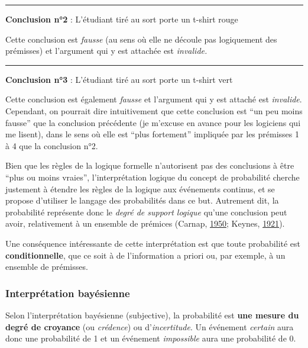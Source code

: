 \documentclass[
  a4paper,11pt,twoside,onecolumn,openright,final,oldfontcommands]{memoir}
\theoremstyle{definition}
\theoremstyle{definition}
\theoremstyle{definition}
\theoremstyle{remark}
\begin{document}
\par

\noindent

\rule{\textwidth}{1pt}

\textbf{Conclusion n°2} : L'étudiant tiré au sort porte un t-shirt rouge

Cette conclusion est \emph{fausse} (au sens où elle ne découle pas logiquement des prémisses) et l'argument qui y est attachée est \emph{invalide.}

\par

\noindent

\rule{\textwidth}{1pt}

\textbf{Conclusion n°3} : L'étudiant tiré au sort porte un t-shirt vert

Cette conclusion est également \emph{fausse} et l'argument qui y est attaché est \emph{invalide}. Cependant, on pourrait dire intuitivement que cette conclusion est ``un peu moins fausse'' que la conclusion précédente (je m'excuse en avance pour les logiciens qui me lisent), dans le sens où elle est ``plus fortement'' impliquée par les prémisses 1 à 4 que la conclusion n°2.

Bien que les règles de la logique formelle n'autorisent pas des conclusions à être ``plus ou moins vraies'', l'interprétation logique du concept de probabilité cherche justement à étendre les règles de la logique aux événements continus, et se propose d'utiliser le langage des probabilités dans ce but. Autrement dit, la probabilité représente donc le \emph{degré de support logique} qu'une conclusion peut avoir, relativement à un ensemble de prémices (Carnap, \protect\hyperlink{ref-carnap_logical_1950}{1950}; Keynes, \protect\hyperlink{ref-keynes_treatise_1921}{1921}).

Une conséquence intéressante de cette interprétation est que toute probabilité est \textbf{conditionnelle}, que ce soit à de l'information a priori ou, par exemple, à un ensemble de prémisses.

\hypertarget{interpruxe9tation-bayuxe9sienne}{%
\subsubsection{Interprétation bayésienne}\label{interpruxe9tation-bayuxe9sienne}}

Selon l'interprétation bayésienne (subjective), la probabilité est \textbf{une mesure du degré de croyance} (ou \emph{crédence}) ou d'\emph{incertitude}. Un événement \emph{certain} aura donc une probabilité de 1 et un événement \emph{impossible} aura une probabilité de 0.
\end{document}

